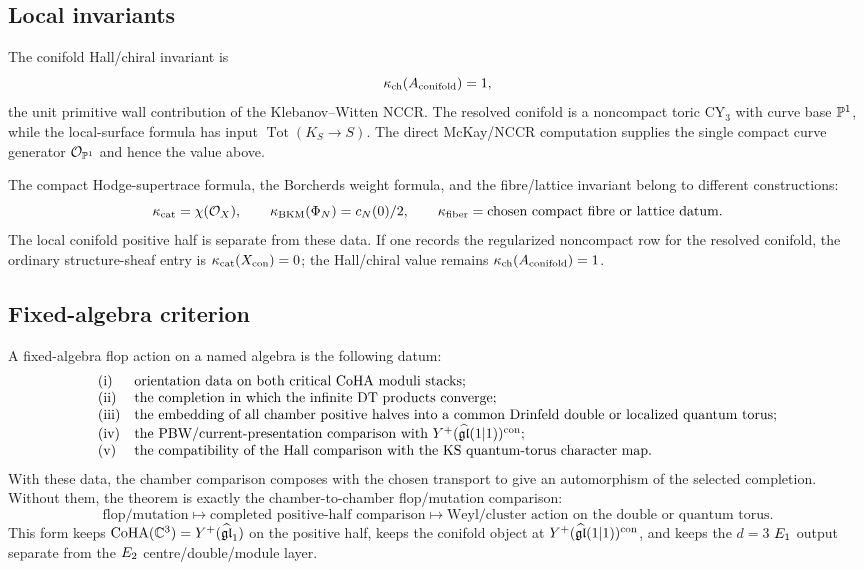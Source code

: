 \subsection*{Local invariants}

The conifold Hall/chiral invariant is
\[
  \kappa_{\mathrm{ch}}(A_{\mathrm{conifold}})=1,
\]
the unit primitive wall contribution of the Klebanov--Witten NCCR.  The
resolved conifold is a noncompact toric CY$_3$ with curve base
$\mathbb{P}^1$, while the local-surface formula has input
$\operatorname{Tot}(K_S\to S)$.  The direct McKay/NCCR computation supplies the
single compact curve generator $\mathcal{O}_{\mathbb{P}^1}$ and hence the value above.

The compact Hodge-supertrace formula, the Borcherds weight formula, and
the fibre/lattice invariant belong to different constructions:
\[
  \kappa_{\mathrm{cat}}=\chi(\mathcal{O}_X),\qquad
  \kappa_{\mathrm{BKM}}(\Phi_N)=c_N(0)/2,\qquad
  \kappa_{\mathrm{fiber}}=\text{chosen compact fibre or lattice datum}.
\]
The local conifold positive half is separate from these data.  If one
records the regularized noncompact row for the resolved conifold, the
ordinary structure-sheaf entry is $\kappa_{\mathrm{cat}}(X_{\mathrm{con}})=0$; the
Hall/chiral value remains $\kappa_{\mathrm{ch}}(A_{\mathrm{conifold}})=1$.

\subsection*{Fixed-algebra criterion}

A fixed-algebra flop action on a named algebra is the following datum:
\[
\begin{array}{ll}
  \mathrm{(i)} & \text{orientation data on both critical CoHA moduli
  stacks;}\\
  \mathrm{(ii)} & \text{the completion in which the infinite DT products
  converge;}\\
  \mathrm{(iii)} & \text{the embedding of all chamber positive halves into
  a common Drinfeld double or localized quantum torus;}\\
  \mathrm{(iv)} & \text{the PBW/current-presentation comparison with
  }Y^+(\widehat{\mathfrak{gl}}(1|1))^{\mathrm{con}}\text{;}\\
  \mathrm{(v)} & \text{the compatibility of the Hall comparison with the
  KS quantum-torus character map.}
\end{array}
\]
With these data, the chamber comparison composes with the chosen
transport to give an automorphism of the selected completion.  Without
them, the theorem is exactly the chamber-to-chamber flop/mutation
comparison:
\[
  \text{flop/mutation}
  \longmapsto
  \text{completed positive-half comparison}
  \longmapsto
  \text{Weyl/cluster action on the double or quantum torus}.
\]
This form keeps
$\mathrm{CoHA}(\mathbb{C}^3)=Y^+(\widehat{\mathfrak{gl}}_1)$ on the positive half, keeps the
conifold object at
$Y^+(\widehat{\mathfrak{gl}}(1|1))^{\mathrm{con}}$, and keeps the $d=3$
$E_{1}$ output separate from the $E_{2}$ centre/double/module layer.

